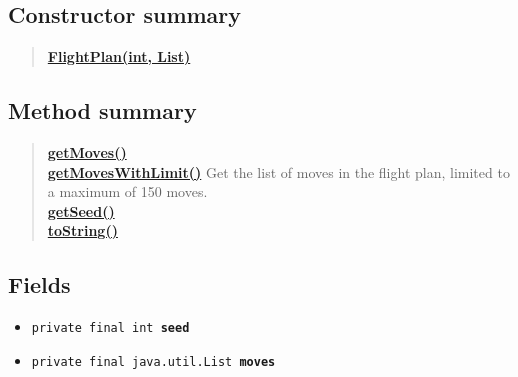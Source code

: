 \documentclass[11pt,a4paper]{report}
\begin{document}
{{{{{{{{{{{{{{{{\subsection{Constructor summary}{
\begin{verse}
\hyperlink{uk.ac.ed.inf.aqmaps.flightplanning.FlightPlan(int, java.util.List)}{{\bf FlightPlan(int, List)}} \\
\end{verse}
}
\subsection{Method summary}{
\begin{verse}
\hyperlink{uk.ac.ed.inf.aqmaps.flightplanning.FlightPlan.getMoves()}{{\bf getMoves()}} \\
\hyperlink{uk.ac.ed.inf.aqmaps.flightplanning.FlightPlan.getMovesWithLimit()}{{\bf getMovesWithLimit()}} Get the list of moves in the flight plan, limited to a maximum of 150 moves.\\
\hyperlink{uk.ac.ed.inf.aqmaps.flightplanning.FlightPlan.getSeed()}{{\bf getSeed()}} \\
\hyperlink{uk.ac.ed.inf.aqmaps.flightplanning.FlightPlan.toString()}{{\bf toString()}} \\
\end{verse}
}
\subsection{Fields}{
\begin{itemize}
\item{
\label{uk.ac.ed.inf.aqmaps.flightplanning.FlightPlan.seed}\hypertarget{uk.ac.ed.inf.aqmaps.flightplanning.FlightPlan.seed}{\texttt{private final int\ {\bf  seed}}
}
}
\item{
\label{uk.ac.ed.inf.aqmaps.flightplanning.FlightPlan.moves}\hypertarget{uk.ac.ed.inf.aqmaps.flightplanning.FlightPlan.moves}{\texttt{private final java.util.List\ {\bf  moves}}
}
}
\end{itemize}
}
}}}}}}}}}}}}}}}}
\end{document}
